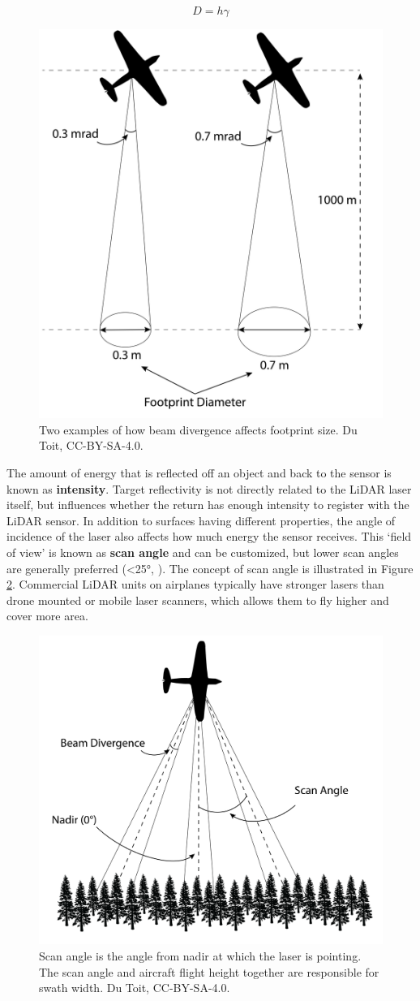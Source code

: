 \documentclass[
]{book}
\begin{document}
\begin{equation} 
  D = h \gamma
  \label{eq:footprint}
\end{equation}

\begin{figure}
\includegraphics[width=0.6\linewidth]{images/15-Beam-Divergence} \caption{Two examples of how beam divergence affects footprint size. Du Toit, CC-BY-SA-4.0.}\label{fig:15-Beam-Divergence}
\end{figure}

The amount of energy that is reflected off an object and back to the sensor is known as \textbf{intensity}. Target reflectivity is not directly related to the LiDAR laser itself, but influences whether the return has enough intensity to register with the LiDAR sensor. In addition to surfaces having different properties, the angle of incidence of the laser also affects how much energy the sensor receives. This `field of view' is known as \textbf{scan angle} and can be customized, but lower scan angles are generally preferred (\textless25°, \citet{white_best_2013}). The concept of scan angle is illustrated in Figure \ref{fig:15-Scan-Angle}. Commercial LiDAR units on airplanes typically have stronger lasers than drone mounted or mobile laser scanners, which allows them to fly higher and cover more area.

\begin{figure}
\includegraphics[width=0.6\linewidth]{images/15-Scan-Angle} \caption{Scan angle is the angle from nadir at which the laser is pointing. The scan angle and aircraft flight height together are responsible for swath width. Du Toit, CC-BY-SA-4.0.}\label{fig:15-Scan-Angle}
\end{figure}
\end{document}
